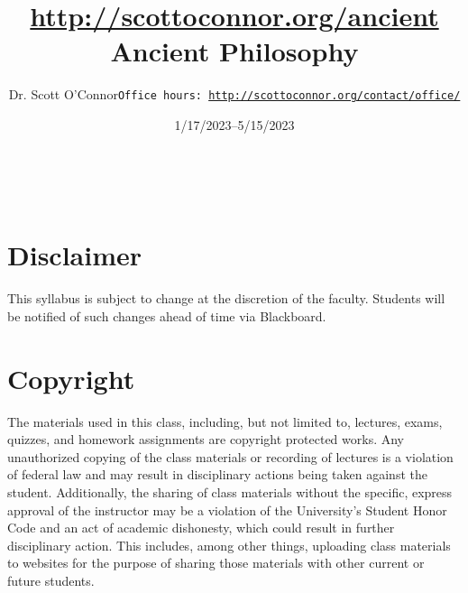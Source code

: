 \documentclass[article,oneside]{memoir}
\def\myauthor{Author}
\def\mytitle{Title}
\def\mycopyright{\myauthor}
\def\myweb{\href{http://scottoconnor.org/ancient}{http://scottoconnor.org/ancient}}
\def\myauthor{Dr. Scott O'Connor}
\def\mytitle{{\normalsize \myweb \newline} \HUGE Ancient Philosophy}
\begin{document}
\setsansfont[Mapping=tex-text]{Myriad Pro} 
\setmonofont[Mapping=tex-text,Scale=0.8]{Georgia} 

\def\ind{\hangindent=1 true cm\hangafter=1 \noindent}
\def\labelitemi{$\cdot$}


\title{\LARGE \mytitle}     
\author{\Large\myauthor \newline \footnotesize\texttt{\noindent Office hours: \href{http://scottoconnor.org/contact/office/}{http://scottoconnor.org/contact/office/}}}
\date{1/17/2023--5/15/2023}

\\


\maketitle




%
%


\section{Disclaimer}
 This syllabus is subject to change at the discretion of the faculty. Students will be notified of such changes ahead of time via Blackboard. 


\section{Copyright}
The materials used in this class, including, but not limited to, lectures, exams, quizzes, and homework assignments are copyright protected works.  Any unauthorized copying of the class materials or recording of lectures is a violation of federal law and may result in disciplinary actions being taken against the student.  Additionally, the sharing of class materials without the specific, express approval of the instructor may be a violation of the University's Student Honor Code and an act of academic dishonesty, which could result in further disciplinary action.  This includes, among other things, uploading class materials to websites for the purpose of sharing those materials with other current or future students. 
\end{document}
